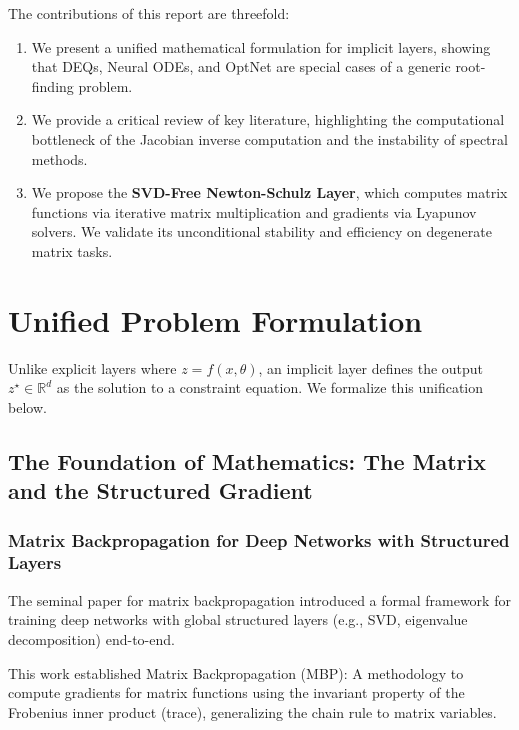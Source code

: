 \documentclass{article}
\newcommand{\R}{\mathbb{R}}
\begin{document}
The contributions of this report are threefold:
\begin{enumerate}
  \item We present a unified mathematical formulation for implicit layers, showing that DEQs, Neural ODEs, and OptNet are special cases of a generic root-finding problem.
  \item We provide a critical review of key literature, highlighting the computational bottleneck of the Jacobian inverse computation and the instability of spectral methods.
  \item We propose the \textbf{SVD-Free Newton-Schulz Layer}, which computes matrix functions via iterative matrix multiplication and gradients via Lyapunov solvers. We validate its unconditional stability and efficiency on degenerate matrix tasks.
\end{enumerate}

\section{Unified Problem Formulation}
\label{sec:unified}

Unlike explicit layers where $z = f(x, \theta)$, an implicit layer defines the output $z^\star \in \R^d$ as the solution to a constraint equation. We formalize this unification below.

\subsection{The Foundation of Mathematics: The Matrix and the Structured Gradient}

\subsubsection{Matrix Backpropagation for Deep Networks with Structured Layers}

The seminal paper for matrix backpropagation \cite{ionescu2015matrix} introduced a formal framework for training deep networks with global structured layers (e.g., SVD, eigenvalue decomposition) end-to-end.

This work established Matrix Backpropagation (MBP): A methodology to compute gradients for matrix functions using the invariant property of the Frobenius inner product (trace), generalizing the chain rule to matrix variables.
\end{document}
